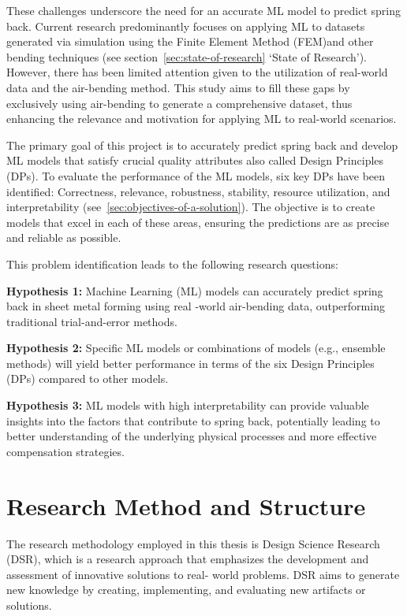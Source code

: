 These challenges underscore the need for an accurate ML model to predict spring back.
Current research predominantly focuses on applying ML to datasets generated via simulation using the Finite Element
Method (FEM)and other bending techniques (see section~\ref{sec:state-of-research} `State of Research').
However, there has been limited attention given to the utilization of real-world data and the air-bending method.
This study aims to fill these gaps by exclusively using air-bending to generate a comprehensive dataset, thus
enhancing the relevance and motivation for applying ML to real-world scenarios.

The primary goal of this project is to accurately predict spring back and develop \ac{ML} models that satisfy crucial
quality attributes also called Design Principles (DPs).
To evaluate the performance of the ML models, six key DPs have been identified:
Correctness, relevance, robustness, stability, resource utilization, and interpretability
(see~\ref{sec:objectives-of-a-solution}).
The objective is to create models that excel in each of these areas, ensuring the predictions are as precise and
reliable as possible.

This problem identification leads to the following research questions:

\begin{tcolorbox}[arc=0pt,boxrule=0.5pt]
    \textbf{Hypothesis 1:} Machine Learning (ML) models can accurately predict spring back in sheet metal forming using
    real -world air-bending data, outperforming traditional trial-and-error methods.

    \textbf{Hypothesis 2:} Specific ML models or combinations of models (e.g., ensemble methods) will yield better
    performance
    in terms of the six Design Principles (DPs) compared to other models.

    \textbf{Hypothesis 3:} ML models with high interpretability can provide valuable insights into the factors that
    contribute to spring back, potentially leading to better understanding of the underlying physical processes and
    more effective compensation strategies.
\end{tcolorbox}


\section{Research Method and Structure}\label{sec:research-method-and-structure}
The research methodology employed in this thesis is Design Science Research (DSR), which is a
research approach that emphasizes the development and assessment of innovative solutions to real-
world problems.
DSR aims to generate new knowledge by creating, implementing, and evaluating new artifacts or
solutions.

